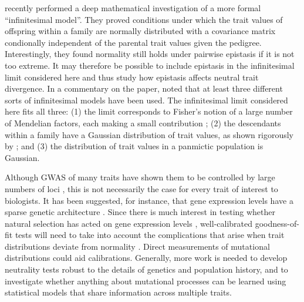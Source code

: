 \citet{Barton2017} recently performed a deep mathematical investigation of a
more formal ``infinitesimal model''. They proved conditions under which the
trait values of offspring within a family are normally distributed with a
covariance matrix condionally independent of the parental trait values given the
pedigree. Interestingly, they found normality still holds under pairwise
epistasis if it is not too extreme. It may therefore be possible to include
epistasis in the infinitesimal limit considered here and thus study how
epistasis affects neutral trait divergence. In a commentary on the
\citet{Barton2017} paper, \citet{Turelli2017} noted that at least three
different sorts of infinitesimal models have been used. The infinitesimal limit
considered here fits all three: (1) the limit corresponds to Fisher's notion of
a large number of Mendelian factors, each making a small contribution
\citep{Fisher1918}; (2) the descendants within a family have a Gaussian
distribution of trait values, as shown rigorously by \citet{Barton2017}; and (3)
the distribution of trait values in a panmictic population is Gaussian.

Although GWAS of many traits have shown them to be controlled by large numbers
of loci \citep{Boyle2017}, this is not necessarily the case for every trait of
interest to biologists. It has been suggested, for instance, that gene
expression levels have a sparse genetic architecture \citep{Wheeler2016}. Since
there is much interest in testing whether natural selection has acted on gene
expression levels \citep{Whitehead2006,Gilad2006,Yang2017}, well-calibrated
goodness-of-fit tests will need to take into account the complications that
arise when trait distributions deviate from normality \citep{Khaitovich2005}.
Direct measurements of mutational distributions \citep{Gruber2012,Metzger2016}
could aid calibrations. Generally, more work is needed to develop neutrality
tests robust to the details of genetics and population history, and to
investigate whether anything about mutational processes can be learned using
statistical models that share information across multiple traits.

